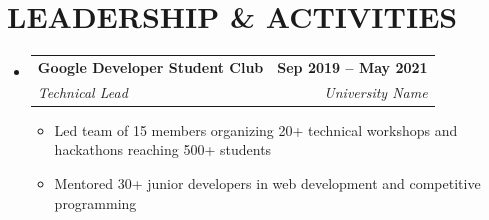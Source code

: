 \documentclass[letterpaper,11pt]{article}
\makeatletter
\newcommand{\customItem}[1]{
  \item\small{
    {#1 \vspace{-2pt}}
  }
}
\newcommand{\customSubHeading}[4]{
  \vspace{-2pt}\item
    \begin{tabular*}{1.0\textwidth}[t]{l@{\extracolsep{\fill}}r}
      \textbf{#1} & \textbf{\small #2} \\
      \textit{\small#3} & \textit{\small #4} \\
    \end{tabular*}\vspace{-7pt}
}
\newcommand{\customSubHeadingContentStart}{\begin{itemize}[leftmargin=0.0in, label={}]}
\newcommand{\customSubHeadingContentEnd}{\end{itemize}}
\newcommand{\customItemListStart}{\begin{itemize}}
\newcommand{\customItemListEnd}{\end{itemize}\vspace{-5pt}}
\makeatother
\begin{document}
\section{LEADERSHIP \& ACTIVITIES}
    \customSubHeadingContentStart
    
        \customSubHeading{Google Developer Student Club}{Sep 2019 – May 2021}{Technical Lead}{University Name}
            \customItemListStart
                \customItem{Led team of 15 members organizing 20+ technical workshops and hackathons reaching 500+ students}
                \customItem{Mentored 30+ junior developers in web development and competitive programming}
            \customItemListEnd
        
    \customSubHeadingContentEnd
\vspace{-10pt}
\end{document}
